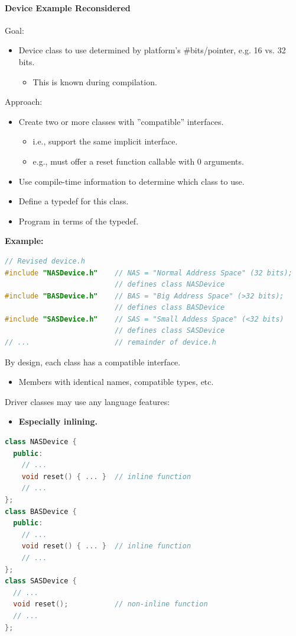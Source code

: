 \paragraph{Device Example Reconsidered}
Goal:
\begin{itemize}
  \item Device class to use determined by platform's \#bits/pointer, e.g. 16 vs. 32 bits.
  \begin{itemize}
    \item This is known during compilation.
  \end{itemize}
\end{itemize}
Approach:
\begin{itemize}
  \item Create two or more classes with ''compatible'' interfaces.
  \begin{itemize}
    \item i.e., support the same implicit interface.
    \item e.g., must offer a reset function callable with 0 arguments.
  \end{itemize}
  \item Use compile-time information to determine which class to use.
  \item Define a typedef for this class.
  \item Program in terms of the typedef.
\end{itemize}

\pagebreak %

\textbf{Example:}
\begin{lstlisting}[language=C++]
// Revised device.h
#include "NASDevice.h"    // NAS = "Normal Address Space" (32 bits);
                          // defines class NASDevice
#include "BASDevice.h"    // BAS = "Big Address Space" (>32 bits);
                          // defines class BASDevice
#include "SASDevice.h"    // SAS = "Small Addess Space" (<32 bits)
                          // defines class SASDevice
// ...                    // remainder of device.h
\end{lstlisting}
By design, each class has a compatible interface.
\begin{itemize}
  \item Members with identical names, compatible types, etc.
\end{itemize}

Driver classes may use any language features:
\begin{itemize}
  \item \textbf{Especially inlining.}
\end{itemize}
\begin{lstlisting}[language=C++]
class NASDevice {
  public:
    // ...
    void reset() { ... }  // inline function
    // ...
};
class BASDevice {
  public:
    // ...
    void reset() { ... }  // inline function
    // ...
};
class SASDevice {
  // ...
  void reset();           // non-inline function
  // ...
};
\end{lstlisting}

